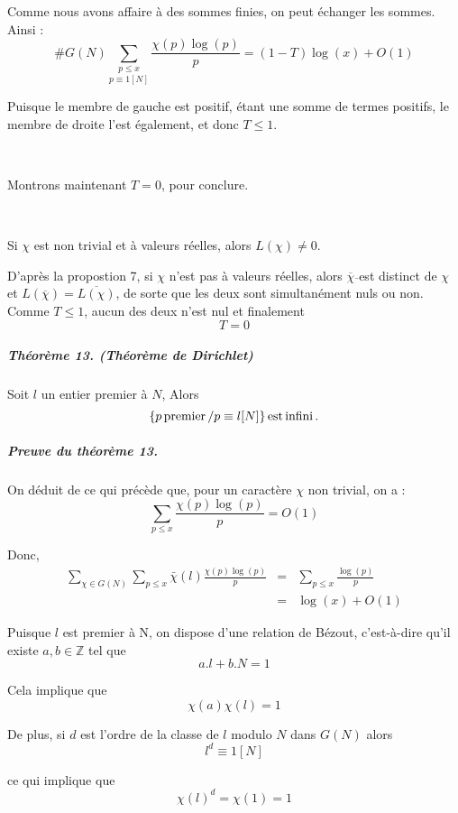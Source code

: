 Comme nous avons affaire {\`a} des sommes finies, on peut {\'e}changer les
sommes. Ainsi :
\[ \#G (N) \underset{p \equiv 1 [N]}{\underset{p \leqslant x}{\sum}}
   \frac{\chi (p) \log (p)}{p} = (1 - T) \log (x) + O (1) \]


Puisque le membre de gauche est positif, {\'e}tant une somme de termes
positifs, le membre de droite l'est {\'e}galement, et donc $T \leqslant 1$.

\

Montrons maintenant $T = 0$, pour conclure.

\

Si $\chi$ est non trivial et {\`a} valeurs r{\'e}elles, alors $L (\chi) \neq
0$.

D'apr{\`e}s la propostion 7, si $\chi$ n'est pas {\`a} valeurs r{\'e}elles,
alors $\overline{\chi} \overline{} $est distinct de $\chi$ et $L
(\overline{\chi}) = \overline{L (\chi)}$, de sorte que les deux sont
simultan{\'e}ment nuls ou non. Comme $T \leqslant 1$, aucun des deux n'est nul
et finalement
\[ T = 0 \]


\subparagraph{Th{\'e}or{\`e}me 13. (Th{\'e}or{\`e}me de Dirichlet)}

Soit $l$ un entier premier {\`a} $N$, Alors
\[ \tmcolor{black}{\{ p \tmop{premier} / p \equiv l [N] \} \tmop{est}
   \tmop{infini} .} \]

\subparagraph{Preuve du th{\'e}or{\`e}me 13.}

On d{\'e}duit de ce qui pr{\'e}c{\`e}de que, pour un caract{\`e}re $\chi$ non
trivial, on a :
\[ \underset{p \leqslant x}{\sum} \frac{\chi (p) \log (p)}{p} = O (1) \]


Donc,
\begin{eqnarray*}
  \underset{\chi \in G (N)}{\sum} \underset{p \leqslant x}{\sum} \bar{\chi}
  (l) \frac{\chi (p) \log (p)}{p} & = & \underset{p \leqslant x}{\sum}
  \frac{\log (p)}{p}\\
  & = & \log (x) + O (1)
\end{eqnarray*}

Puisque $l$ est premier {\`a} N, on dispose d'une relation de B{\'e}zout,
c'est-{\`a}-dire qu'il existe $a, b \in \mathbb{Z}$ tel que
\[ a.l + b.N = 1 \]


Cela implique que
\[ \chi (a) \chi (l) = 1 \]


De plus, si $d$ est l'ordre de la classe de $l$ modulo $N$ dans $G (N)$ alors
\[ l^d \equiv 1 [N] \]


ce qui implique que
\[ \chi (l)^d = \chi (1) = 1 \]


